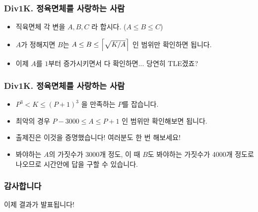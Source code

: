 \documentclass[xetex]{beamer}
\DeclarePairedDelimiter\ceil{\lceil}{\rceil}
\begin{document}
\begin{frame}
  \frametitle{Div1K. 정육면체를 사랑하는 사람}
  \begin{itemize}
    \item 직육면체 각 변을 $A, B, C$ 라 합시다. ($A \le B \le C$)
    \item $A$가 정해지면 $B$는  $A \le B \le \ceil*{\sqrt{K/A}}$ 인 범위만 확인하면 됩니다.
    \item 이제 $A$를 $1$부터 증가시키면서 다 확인하면... 당연히 TLE겠죠?
  \end{itemize}
\end{frame}

\begin{frame}
  \frametitle{Div1K. 정육면체를 사랑하는 사람}
  \begin{itemize}
    \item $P^3 < K \le (P+1)^3$  을 만족하는 $P$를 잡습니다.
    \item 최악의 경우 $P - 3000 \le A \le P+1$ 인 범위만 확인해보면 됩니다.
    \item 출제진은 이것을 증명했습니다! 여러분도 한 번 해보세요!
    \item 봐야하는 $A$의 가짓수가 3000개 정도, 이 때 $B$도 봐야하는 가짓수가 4000개 정도로 나오므로 시간안에 답을 구할 수 있습니다.
  \end{itemize}
\end{frame}

\begin{frame}
  \frametitle{감사합니다}
  \begin{center}
    이제 결과가 발표됩니다!
  \end{center}
\end{frame}
\end{document}
